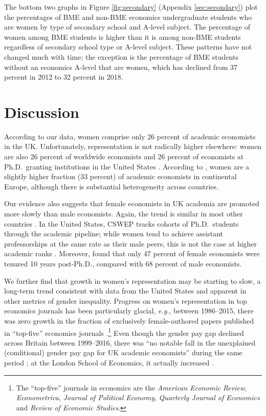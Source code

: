 \documentclass[a4paper, 1]{article}
\begin{document}
The bottom two graphs in Figure \ref{fig:secondary} (Appendix \ref{sec:secondary}) plot the percentages of BME and non-BME economics undergraduate students who are women by type of secondary school and A-level subject. The percentage of women among BME students is higher than it is among non-BME students regardless of secondary school type or A-level subject. These patterns have not changed much with time; the exception is the percentage of BME students without an economics A-level that are women, which has declined from 37 percent in 2012 to 32 percent in 2018.

\hypertarget{sec:discussion}{%
\section{Discussion}\label{sec:discussion}}

According to our data, women comprise only 26 percent of academic economists in the UK. Unfortunately, representation is not radically higher elsewhere: women are also 26 percent of worldwide economists \citep{RePEc2022} and 26 percent of economists at Ph.D.~granting institutions in the United States \citep{Chevalier2021}. According to \citet{Auriol2022}, women are a slightly higher fraction (33 percent) of academic economists in continental Europe, although there is substantial heterogeneity across countries.

Our evidence also suggests that female economists in UK academia are promoted more slowly than male economists. Again, the trend is similar in most other countries \citep[see, \emph{e.g.},][]{Auriol2022, Ceci2014, Chevalier2021, Ginther2014, Jacobsen2006b, Lundberg2019}. In the United States, CSWEP tracks cohorts of Ph.D.~students through the academic pipeline; while women tend to achieve assistant professorships at the same rate as their male peers, this is not the case at higher academic ranks \citep{Chevalier2021, Lundberg2019}. Moreover, \citet{Ginther2004} found that only 47 percent of female economists were tenured 10 years post-Ph.D., compared with 68 percent of male economists.

We further find that growth in women's representation may be starting to slow, a long-term trend consistent with data from the United States \citep{Lundberg2019} and apparent in other metrics of gender inequality. Progress on women's representation in top economics journals has been particularly glacial, \emph{e.g.}, between 1986--2015, there was zero growth in the fraction of exclusively female-authored papers published in ``top-five'' economics journals \citep{Moon2022}.\footnote{The ``top-five'' journals in economics are the \emph{American Economic Review}, \emph{Econometrica}, \emph{Journal of Political Economy}, \emph{Quarterly Journal of Economics} and \emph{Review of Economic Studies}.} Even though the gender pay gap declined across Britain between 1999--2016, there was ``no notable fall in the unexplained (conditional) gender pay gap for UK academic economists'' during the same period \citep[p.~103]{Mumford2019}; at the London School of Economics, it actually increased \citep{Bandiera2016}.
\end{document}
